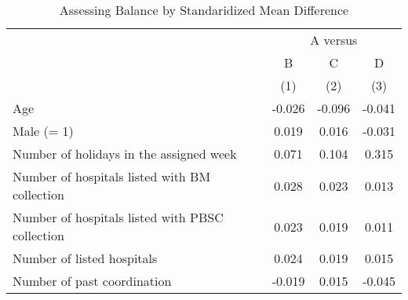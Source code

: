 \documentclass[12pt, a4paper]{article}
\begin{document}
\begin{table}[H]

\caption{\label{tab:smd-balance}Assessing Balance by Standaridized Mean Difference}
\centering
\fontsize{9}{11}\selectfont
\begin{threeparttable}
\begin{tabular}[t]{lccc}
\toprule
\multicolumn{1}{c}{ } & \multicolumn{3}{c}{A versus} \\
\cmidrule(l{3pt}r{3pt}){2-4}
\multicolumn{1}{c}{ } & \multicolumn{1}{c}{B} & \multicolumn{1}{c}{C} & \multicolumn{1}{c}{D} \\
\cmidrule(l{3pt}r{3pt}){2-2} \cmidrule(l{3pt}r{3pt}){3-3} \cmidrule(l{3pt}r{3pt}){4-4}
 & (1) & (2) & (3)\\
\midrule
Age & -0.026 & -0.096 & -0.041\\
Male (= 1) & 0.019 & 0.016 & -0.031\\
Number of holidays in the assigned week & 0.071 & 0.104 & 0.315\\
Number of hospitals listed with BM collection & 0.028 & 0.023 & 0.013\\
Number of hospitals listed with PBSC collection & 0.023 & 0.019 & 0.011\\
Number of listed hospitals & 0.024 & 0.019 & 0.015\\
Number of past coordination & -0.019 & 0.015 & -0.045\\
\bottomrule
\end{tabular}
\begin{tablenotes}
\item 
\end{tablenotes}
\end{threeparttable}
\end{table}
\end{document}
